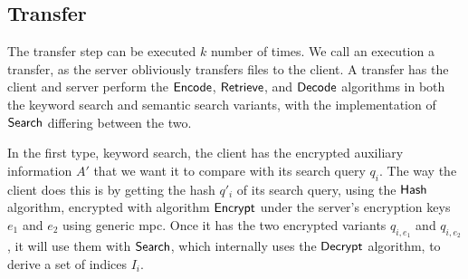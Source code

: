 \subsection*{\thesubsection\quad Transfer}\label{subsec:OverviewTransfer}

The transfer step can be executed $ k $ number of times. We call an execution a transfer, as the server obliviously transfers files to the client. A transfer has the client and server perform the $ \mathsf{{Encode}} $, $ \mathsf{{Retrieve}} $, and $ \mathsf{{Decode}} $ algorithms in both the keyword search and semantic search variants, with the implementation of $ \mathsf{{Search}} $ differing between the two.

In the first type, keyword search, the client has the encrypted auxiliary information $ A' $ that we want it to compare with its search query $ q_i $. The way the client does this is by getting the hash $ q'_i $ of its search query, using the $ \mathsf{Hash} $ algorithm, encrypted with algorithm $ \mathsf{{Encrypt}} $ under the server's encryption keys $ e_1 $ and $ e_2 $ using generic \acrshort{mpc}. Once it has the two encrypted variants $ q_{i, e_1} $ and $ q_{i, e_2} $, it will use them with $ \mathsf{{Search}} $, which internally uses the $  \mathsf{{Decrypt}}$ algorithm, to derive a set of indices $ I_i $.

